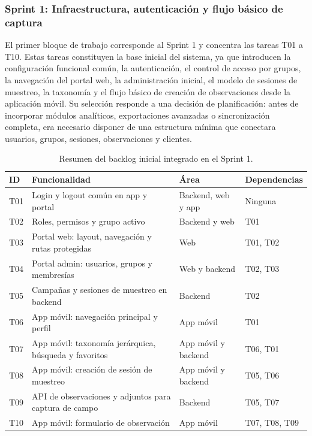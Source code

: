 \subsubsection{Sprint 1: Infraestructura, autenticación y flujo básico de captura}

El primer bloque de trabajo corresponde al Sprint 1 y concentra las tareas T01 a
T10. Estas tareas constituyen la base inicial del sistema, ya que introducen la
configuración funcional común, la autenticación, el control de acceso por grupos,
la navegación del portal web, la administración inicial, el modelo de sesiones de
muestreo, la taxonomía y el flujo básico de creación de observaciones desde la
aplicación móvil. Su selección responde a una decisión de planificación: antes de
incorporar módulos analíticos, exportaciones avanzadas o sincronización completa,
era necesario disponer de una estructura mínima que conectara usuarios, grupos,
sesiones, observaciones y clientes.

\begin{table}[H]
  \centering
  \caption{Resumen del backlog inicial integrado en el Sprint 1.}
  \label{tab:backlog_sprint1_resumen}
  \begin{tabularx}{\textwidth}{lXlX}
    \toprule
    \textbf{ID} & \textbf{Funcionalidad} & \textbf{Área} & \textbf{Dependencias} \\
    \midrule
    T01 & Login y logout común en app y portal & Backend, web y app & Ninguna \\
    T02 & Roles, permisos y grupo activo & Backend y web & T01 \\
    T03 & Portal web: layout, navegación y rutas protegidas & Web & T01, T02 \\
    T04 & Portal admin: usuarios, grupos y membresías & Web y backend & T02, T03 \\
    T05 & Campañas y sesiones de muestreo en backend & Backend & T02 \\
    T06 & App móvil: navegación principal y perfil & App móvil & T01 \\
    T07 & App móvil: taxonomía jerárquica, búsqueda y favoritos & App móvil y backend & T06, T01 \\
    T08 & App móvil: creación de sesión de muestreo & App móvil y backend & T05, T06 \\
    T09 & API de observaciones y adjuntos para captura de campo & Backend & T05, T07 \\
    T10 & App móvil: formulario de observación & App móvil & T07, T08, T09 \\
    \bottomrule
  \end{tabularx}
\end{table}

